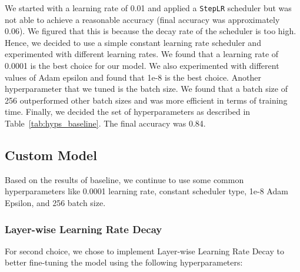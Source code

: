 \documentclass{article}
\begin{document}
    We started with a learning rate of 0.01 and applied a \texttt{StepLR} scheduler but was not able to achieve a reasonable
    accuracy (final accuracy was approximately 0.06).
    We figured that this is because the decay rate of the scheduler is too high.
    Hence, we decided to use a simple constant learning rate scheduler and experimented with different learning rates.
    We found that a learning rate of 0.0001 is the best choice for our model.
    We also experimented with different values of Adam epsilon and found that 1e-8 is the best choice.
    Another hyperparameter that we tuned is the batch size.
    We found that a batch size of 256 outperformed other batch sizes and was more efficient in terms of training time.
    Finally, we decided the set of hyperparameters as described in Table~\ref{tab:hyps_baseline}.
    The final accuracy was 0.84.

    \subsection{Custom Model}
    Based on the results of baseline, we continue to use some common hyperparameters like 0.0001 learning rate, constant scheduler type, 1e-8 Adam Epsilon, and 256 batch size.
    \subsubsection{Layer-wise Learning Rate Decay}
    For second choice, we chose to implement Layer-wise Learning Rate Decay to better fine-tuning the model using the following hyperparameters:
\end{document}
